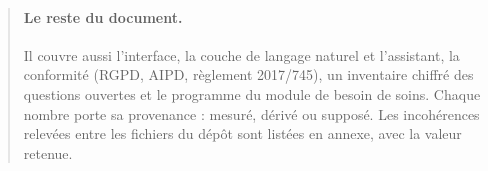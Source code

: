 \begin{abstract}
\paragraph{Le reste du document.} Il couvre aussi l'interface, la couche de langage naturel et l'assistant, la
conformité (RGPD, AIPD, règlement 2017/745), un inventaire chiffré des questions ouvertes et le programme du
module de besoin de soins. Chaque nombre porte sa provenance : mesuré\mesure, dérivé\derive{} ou
supposé\suppose. Les incohérences relevées entre les fichiers du dépôt sont listées en annexe, avec la valeur
retenue.
\end{abstract}
